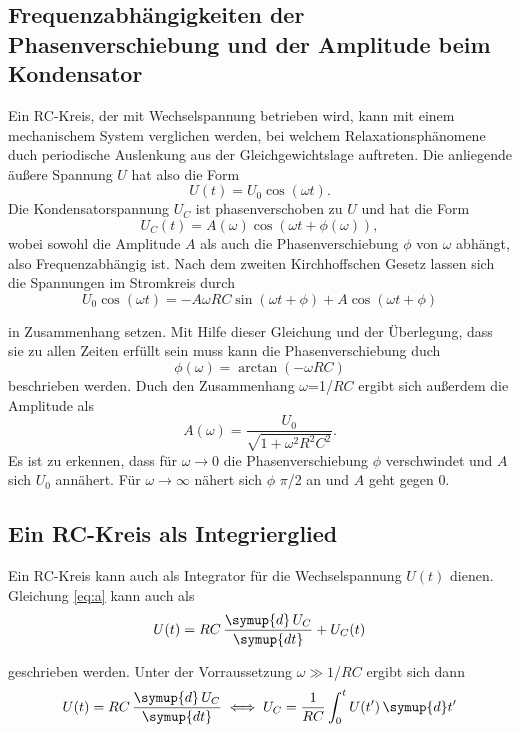 \subsection{Frequenzabhängigkeiten der Phasenverschiebung und der Amplitude beim Kondensator}
Ein RC-Kreis, der mit Wechselspannung betrieben wird,
kann mit einem mechanischem System verglichen werden,
bei welchem Relaxationsphänomene duch periodische
Auslenkung aus der Gleichgewichtslage auftreten.
Die anliegende äußere Spannung $U$ hat also die Form
\begin{equation}
    U(t)=U_0 \cos (\omega t).
\end{equation}
\noindent Die Kondensatorspannung $U_C$ ist
phasenverschoben zu $U$ und hat die Form
\begin{equation}
    U_C(t)=A(\omega) \cos (\omega t + \phi(\omega)),
\end{equation}
\noindent wobei sowohl die Amplitude $A$ als auch
die Phasenverschiebung $\phi$ von $\omega$
abhängt, also Frequenzabhängig ist. Nach dem zweiten
Kirchhoffschen Gesetz lassen sich die Spannungen
im Stromkreis durch
\begin{equation}
    U_0 \cos (\omega t)=-A\omega RC \sin (\omega t + \phi)+A \cos (\omega t+\phi)
    \label{eq:a}
\end{equation}

\noindent in Zusammenhang setzen. Mit Hilfe dieser
Gleichung und der Überlegung, dass sie zu allen Zeiten 
erfüllt sein muss kann die Phasenverschiebung duch
\begin{equation}
    \phi (\omega)= \arctan (-\omega RC)
\end{equation}
\noindent beschrieben werden. Duch den Zusammenhang
$\omega$=1/$RC$ ergibt sich außerdem die Amplitude als
\begin{equation}
    A(\omega)=\frac{U_0}{\sqrt{1+\omega^2 R^2 C^2}}.
\end{equation}
\noindent Es ist zu erkennen, dass für
$\omega \to 0$ die Phasenverschiebung $\phi$ verschwindet
und $A$ sich $U_0$ annähert. Für $\omega \to \infty$
nähert sich $\phi$ $\pi$/2 an und $A$ geht gegen 0.

\subsection{Ein RC-Kreis als Integrierglied}
Ein RC-Kreis kann auch als Integrator für die
Wechselspannung $U(t)$ dienen. Gleichung \ref{eq:a} kann
auch als
\begin{equation}
    U(t)=RC \, \frac{\symup{d}\,U_C}{\symup{dt}}+U_C(t)
\end{equation}

\noindent geschrieben werden. Unter der Vorraussetzung
$\omega \gg 1$/$RC$ ergibt sich dann
\begin{equation}
    U(t)=RC \, \frac{\symup{d}\,U_C}{\symup{dt}} \iff U_C=\frac{1}{RC}\int_0^t U(t')\,\symup{d}t'
\end{equation}

